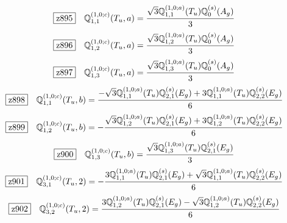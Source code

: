 \documentclass[fleqn,10pt,landscape]{jsarticle}
\begin{document}
\begin{dmath*}
\hspace*{3mm}\fbox{z895}\quad \mathbb{Q}_{1,1}^{(1,0;c)}(T_{u},a)=\frac{\sqrt{3} \mathbb{Q}_{1,1}^{(1,0;a)}(T_{u}) \mathbb{Q}_{0}^{(s)}(A_{g})}{3}
\end{dmath*}
\begin{dmath*}
\hspace*{3mm}\fbox{z896}\quad \mathbb{Q}_{1,2}^{(1,0;c)}(T_{u},a)=\frac{\sqrt{3} \mathbb{Q}_{1,2}^{(1,0;a)}(T_{u}) \mathbb{Q}_{0}^{(s)}(A_{g})}{3}
\end{dmath*}
\begin{dmath*}
\hspace*{3mm}\fbox{z897}\quad \mathbb{Q}_{1,3}^{(1,0;c)}(T_{u},a)=\frac{\sqrt{3} \mathbb{Q}_{1,3}^{(1,0;a)}(T_{u}) \mathbb{Q}_{0}^{(s)}(A_{g})}{3}
\end{dmath*}
\begin{dmath*}
\hspace*{3mm}\fbox{z898}\quad \mathbb{Q}_{1,1}^{(1,0;c)}(T_{u},b)=\frac{- \sqrt{3} \mathbb{Q}_{1,1}^{(1,0;a)}(T_{u}) \mathbb{Q}_{2,1}^{(s)}(E_{g}) + 3 \mathbb{Q}_{1,1}^{(1,0;a)}(T_{u}) \mathbb{Q}_{2,2}^{(s)}(E_{g})}{6}
\end{dmath*}
\begin{dmath*}
\hspace*{3mm}\fbox{z899}\quad \mathbb{Q}_{1,2}^{(1,0;c)}(T_{u},b)=- \frac{\sqrt{3} \mathbb{Q}_{1,2}^{(1,0;a)}(T_{u}) \mathbb{Q}_{2,1}^{(s)}(E_{g}) + 3 \mathbb{Q}_{1,2}^{(1,0;a)}(T_{u}) \mathbb{Q}_{2,2}^{(s)}(E_{g})}{6}
\end{dmath*}
\begin{dmath*}
\hspace*{3mm}\fbox{z900}\quad \mathbb{Q}_{1,3}^{(1,0;c)}(T_{u},b)=\frac{\sqrt{3} \mathbb{Q}_{1,3}^{(1,0;a)}(T_{u}) \mathbb{Q}_{2,1}^{(s)}(E_{g})}{3}
\end{dmath*}
\begin{dmath*}
\hspace*{3mm}\fbox{z901}\quad \mathbb{Q}_{3,1}^{(1,0;c)}(T_{u},2)=- \frac{3 \mathbb{Q}_{1,1}^{(1,0;a)}(T_{u}) \mathbb{Q}_{2,1}^{(s)}(E_{g}) + \sqrt{3} \mathbb{Q}_{1,1}^{(1,0;a)}(T_{u}) \mathbb{Q}_{2,2}^{(s)}(E_{g})}{6}
\end{dmath*}
\begin{dmath*}
\hspace*{3mm}\fbox{z902}\quad \mathbb{Q}_{3,2}^{(1,0;c)}(T_{u},2)=\frac{3 \mathbb{Q}_{1,2}^{(1,0;a)}(T_{u}) \mathbb{Q}_{2,1}^{(s)}(E_{g}) - \sqrt{3} \mathbb{Q}_{1,2}^{(1,0;a)}(T_{u}) \mathbb{Q}_{2,2}^{(s)}(E_{g})}{6}
\end{dmath*}
\end{document}
